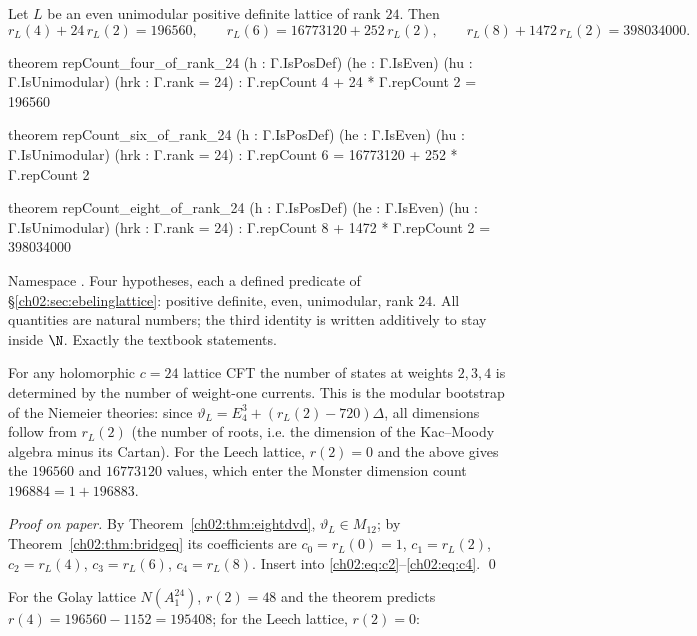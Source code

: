 \begin{theorem}\label{ch02:thm:rank24}
Let $L$ be an even unimodular positive definite lattice of rank $24$.  Then
\begin{equation*}
r_L(4)+24\,r_L(2)=196560,\qquad r_L(6)=16773120+252\,r_L(2),\qquad
r_L(8)+1472\,r_L(2)=398034000 .
\end{equation*}
\end{theorem}
\begin{leancode}
theorem repCount_four_of_rank_24 (h : Γ.IsPosDef) (he : Γ.IsEven) (hu : Γ.IsUnimodular)
    (hrk : Γ.rank = 24) : Γ.repCount 4 + 24 * Γ.repCount 2 = 196560

theorem repCount_six_of_rank_24 (h : Γ.IsPosDef) (he : Γ.IsEven) (hu : Γ.IsUnimodular)
    (hrk : Γ.rank = 24) : Γ.repCount 6 = 16773120 + 252 * Γ.repCount 2

theorem repCount_eight_of_rank_24 (h : Γ.IsPosDef) (he : Γ.IsEven) (hu : Γ.IsUnimodular)
    (hrk : Γ.rank = 24) : Γ.repCount 8 + 1472 * Γ.repCount 2 = 398034000
\end{leancode}
\begin{dictionary}
Namespace .  Four hypotheses, each a defined predicate of
\S\ref{ch02:sec:ebelinglattice}: positive definite, even, unimodular, rank $24$.  All quantities
are natural numbers; the third identity is written additively to stay inside $\N$.  Exactly the
textbook statements.
\end{dictionary}
\begin{physics}
For any holomorphic $c=24$ lattice CFT the number of states at weights $2,3,4$ is determined by the number of weight-one currents. This is the modular bootstrap of the Niemeier theories: since $\vartheta_L=E_4^3+(r_L(2)-720)\Delta$, all dimensions follow from $r_L(2)$ (the number of roots, i.e. the dimension of the Kac--Moody algebra minus its Cartan). For the Leech lattice, $r(2)=0$ and the above gives the $196560$ and $16773120$ values, which enter the Monster dimension count $196884=1+196883$.
\end{physics}
\emph{Proof on paper.}  By Theorem~\ref{ch02:thm:eightdvd}, $\vartheta_L\in M_{12}$; by
Theorem~\ref{ch02:thm:bridgeq} its coefficients are $c_0=r_L(0)=1$, $c_1=r_L(2)$, $c_2=r_L(4)$,
$c_3=r_L(6)$, $c_4=r_L(8)$.  Insert into \eqref{ch02:eq:c2}--\eqref{ch02:eq:c4}.  \qed

For the Golay lattice $N(A_1^{24})$, $r(2)=48$ and the theorem predicts $r(4)=196560-1152=195408$;
for the Leech lattice, $r(2)=0$:


